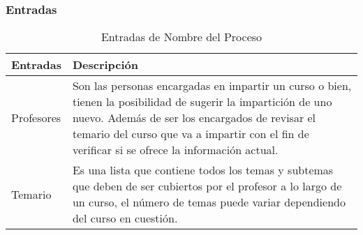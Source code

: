 \subsubsection{Entradas}							%

\begin{table}[H]
\centering
	\begin{tabular}{p{5cm} p{11cm}}
		\hline
			\textbf{Entradas} & \textbf{Descripción}\\
		\hline
		\hline
		Profesores & Son las personas encargadas en impartir un curso o bien, tienen la posibilidad de sugerir la impartici\'on de uno nuevo. Adem\'as de ser los encargados de revisar el temario del curso que va a impartir con el fin de verificar si se ofrece la informaci\'on actual.  \\
		\hline
		Temario & Es una lista que contiene todos los temas y subtemas que deben de ser cubiertos por el profesor a lo largo de un curso, el n\'umero de temas puede variar dependiendo del curso en cuesti\'on.    \\	
		\hline
	\end{tabular}
\caption{Entradas de Nombre del Proceso}
\end{table}